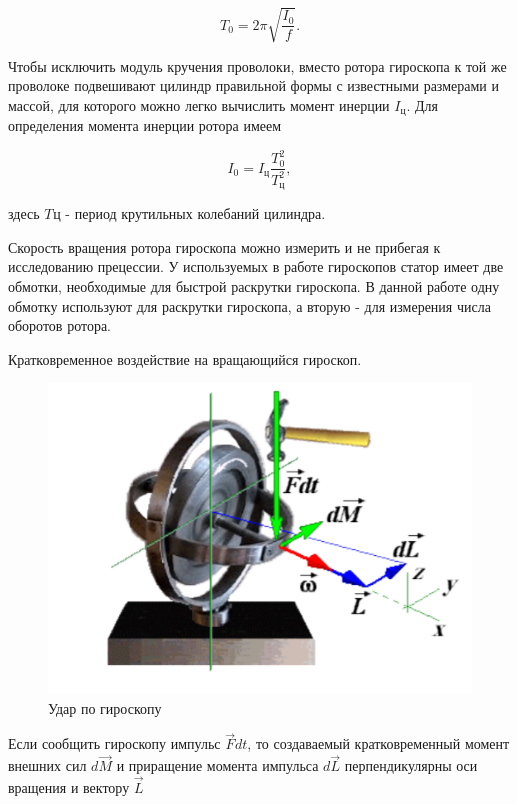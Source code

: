 \documentclass[12pt,a4paper]{article}
\begin{document}
\begin{equation}
T_0 = 2\pi \sqrt{\frac{I_0}{f}}.
\end{equation} 

Чтобы исключить модуль кручения проволоки, вместо ротора гироскопа к той же проволоке подвешивают цилиндр правильной формы с известными размерами и массой, для которого можно легко вычислить момент инерции $I_{\textit{ц}}$. Для определения момента инерции ротора имеем

\begin{equation}
I_0 = I_{\textit{ц}} \frac{T_0^2}{T_{\textit{ц}}^2},
\end{equation}

здесь $T_{}\textit{ц}$ - период крутильных колебаний цилиндра.

Скорость вращения ротора гироскопа можно измерить и не прибегая к исследованию прецессии. У используемых в работе гироскопов статор имеет две обмотки, необходимые для быстрой раскрутки гироскопа. В данной работе одну обмотку используют для раскрутки гироскопа, а вторую - для измерения числа оборотов ротора.

\vspace{3cm}

Кратковременное воздействие на вращающийся гироскоп.

\begin{figure}[h!]
\centering
\includegraphics[scale=0.7]{kick_hyro.png}
\caption{Удар по гироскопу}
\label{fig:Kick hyro}
\end{figure}

Если сообщить гироскопу импульс $\overrightarrow{F}dt$, то создаваемый кратковременный момент внешних сил $d\overrightarrow{M}$ и приращение момента импульса $d\overrightarrow{L}$ перпендикулярны оси вращения и вектору $\overrightarrow{L}$
\end{document}
